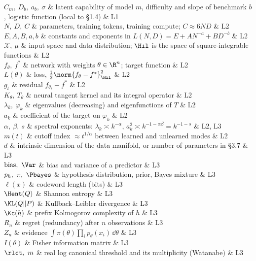 \begin{notationchunk}
$C_m,\ D_b,\ a_b,\ \sigma$ & latent capability of model $m$, difficulty and slope of benchmark $b$, logistic function (local to \S1.4) & L1\\
$N,\ D,\ C$ & parameters, training tokens, training compute; $C\approx6ND$ & L2\\
$E,A,B,a,b$ & constants and exponents in $L(N,D)=E+AN^{-a}+BD^{-b}$ & L2\\
$\mathcal X,\ \mu$ & input space and data distribution; $\Hil$ is the space of square-integrable functions & L2\\
$f_\theta,\ f^*$ & network with weights $\theta\in\R^n$; target function & L2\\
$L(\theta)$ & loss, $\tfrac12\norm{f_\theta-f^*}^2_{\Hil}$ & L2\\
$g_t$ & residual $f_{\theta_t}-f^*$ & L2\\
$K_\theta,\ T_\theta$ & neural tangent kernel and its integral operator & L2\\
$\lambda_k,\ \varphi_k$ & eigenvalues (decreasing) and eigenfunctions of $T$ & L2\\
$a_k$ & coefficient of the target on $\varphi_k$ & L2\\
$\alpha,\ \beta,\ s$ & spectral exponents: $\lambda_k\asymp k^{-\alpha}$, $a_k^2\asymp k^{-1-\alpha\beta}=k^{-1-s}$ & L2, L3\\
$m(t)$ & cutoff index $\approx t^{1/\alpha}$ between learned and unlearned modes & L2\\
$d$ & intrinsic dimension of the data manifold, or number of parameters in \S3.7 & L3\\
$\mathrm{bias},\ \Var$ & bias and variance of a predictor & L3\\
$p_h,\ \pi,\ \Pbayes$ & hypothesis distribution, prior, Bayes mixture & L3\\
$\ell(x)$ & codeword length (bits) & L3\\
$\Hent(Q)$ & Shannon entropy & L3\\
$\KL(Q\|P)$ & Kullback--Leibler divergence & L3\\
$\Kc(h)$ & prefix Kolmogorov complexity of $h$ & L3\\
$R_n$ & regret (redundancy) after $n$ observations & L3\\
$Z_n$ & evidence $\int\pi(\theta)\prod_ip_\theta(x_i)\,\dd\theta$ & L3\\
$I(\theta)$ & Fisher information matrix & L3\\
$\rlct,\ m$ & real log canonical threshold and its multiplicity (Watanabe) & L3\\

\end{notationchunk}
